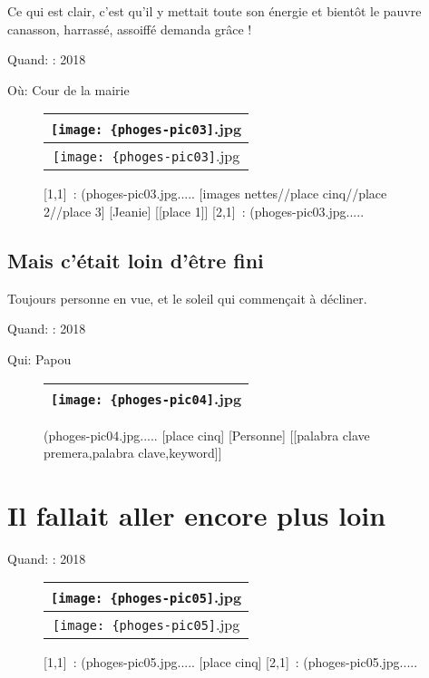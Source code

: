 \documentclass[12pt,twocolumn,french]{article}
\begin{document}
Ce qui est clair, c'est qu'il y mettait toute son énergie et bientôt le pauvre canasson, harrassé, assoiffé demanda grâce !


Quand: : 2018


Où: Cour de la mairie

  \begin{figure}[H]
    \caption{
      [1,1]~: 
      (phoges-pic03.jpg.....
       [images nettes//place cinq//place 2//place 3] 
       [Jeanie] 
      [[place 1]] 
      [2,1]~: 
      (phoges-pic03.jpg.....
    }
    \vspace{4mm}
    \label{phoges-pic03.jpg}
    \noindent \centering{}
    \begin{tabular}{|c|}
      \hline
          \texttt{[image: \{phoges-pic03]}.jpg}
        \tabularnewline \hline
          \texttt{[image: \{phoges-pic03]}.jpg}
        \tabularnewline \hline
    \end{tabular}
  \end{figure}
%
\subsection{Mais c'était loin d'être fini}
%

Toujours personne en vue, et le soleil qui commençait à décliner.


Quand: : 2018


Qui: Papou

  \begin{figure}[H]
    \caption{
      (phoges-pic04.jpg.....
       [place cinq] 
       [Personne] 
      [[palabra clave premera,palabra clave,keyword]] 
    }
    \vspace{4mm}
    \label{phoges-pic04.jpg}
    \noindent \centering{}
    \begin{tabular}{|c|}
      \hline
          \texttt{[image: \{phoges-pic04]}.jpg}
        \tabularnewline \hline
    \end{tabular}
  \end{figure}
%
\section{Il fallait aller encore plus loin}
%


Quand: : 2018

  \begin{figure}[H]
    \caption{
      [1,1]~: 
      (phoges-pic05.jpg.....
       [place cinq] 
      [2,1]~: 
      (phoges-pic05.jpg.....
    }
    \vspace{4mm}
    \label{phoges-pic05.jpg}
    \noindent \centering{}
    \begin{tabular}{|c|}
      \hline
          \texttt{[image: \{phoges-pic05]}.jpg}
        \tabularnewline \hline
          \texttt{[image: \{phoges-pic05]}.jpg}
        \tabularnewline \hline
    \end{tabular}
  \end{figure}
%
\end{document}
